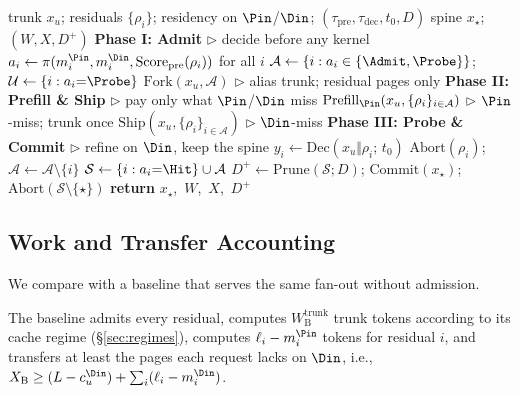 \begin{algorithm}[t]
\caption{\sys{} (one fan-out).
Actions follow \eqref{eq:action}; costs follow \eqref{eq:work}--\eqref{eq:dec}.}
\label{alg:app}
\small
\begin{algorithmic}[1]
\REQUIRE trunk $x_u$; residuals $\{\rho_i\}$; residency on $\Pin$/$\Din$; $(\tau_{\mathrm{pre}},\tau_{\mathrm{dec}},t_0,D)$
\ENSURE spine $x_\star$; $(W,X,D^{+})$
\STATE
\STATE \textbf{Phase I: Admit} \hfill \(\triangleright\) decide before any kernel
\STATE $a_i\leftarrow\pi(m_i^{\Pin},m_i^{\Din},\mathrm{Score}_{\mathrm{pre}}(\rho_i))$ for all $i$
\STATE $\mathcal{A}\leftarrow\{i:a_i\in\{\Admit,\Probe\}\}$;\;
  $\mathcal{U}\leftarrow\{i:a_i{=}\Probe\}$
\STATE $\mathrm{Fork}(x_u,\mathcal{A})$ \hfill \(\triangleright\) alias trunk; residual pages only
\STATE
\STATE \textbf{Phase II: Prefill \& Ship} \hfill \(\triangleright\) pay only what $\Pin$/$\Din$ miss
\STATE $\mathrm{Prefill}_{\Pin}(x_u,\{\rho_i\}_{i\in\mathcal{A}})$ \hfill \(\triangleright\) $\Pin$-miss; trunk once
\STATE $\mathrm{Ship}(x_u,\{\rho_i\}_{i\in\mathcal{A}})$ \hfill \(\triangleright\) $\Din$-miss
\STATE
\STATE \textbf{Phase III: Probe \& Commit} \hfill \(\triangleright\) refine on $\Din$, keep the spine
  \STATE $y_i\leftarrow\mathrm{Dec}(x_u\Vert\rho_i;\,t_0)$
    \STATE $\mathrm{Abort}(\rho_i)$;\; $\mathcal{A}\leftarrow\mathcal{A}\setminus\{i\}$
  \ENDIF
\ENDFOR
\STATE $\mathcal{S}\leftarrow\{i:a_i{=}\Hit\}\cup\mathcal{A}$
\STATE $D^{+}\leftarrow\mathrm{Prune}(\mathcal{S};D)$;\;
  $\mathrm{Commit}(x_\star)$;\;
  $\mathrm{Abort}(\mathcal{S}\setminus\{\star\})$
\STATE \textbf{return} $x_\star$,\ $W$,\ $X$,\ $D^{+}$
\end{algorithmic}
\end{algorithm}

\subsection{Work and Transfer Accounting}
\label{sec:accounting}

We compare \sys with a baseline that serves the same fan-out without admission.

\begin{assumption}[Baseline]
\label{ass:baseline}
The baseline admits every residual, computes $W_{\mathrm{B}}^{\mathrm{trunk}}$ trunk tokens according to its cache regime (\S\ref{sec:regimes}), computes $\ell_i-m_i^{\Pin}$ tokens for residual $i$, and transfers at least the pages each request lacks on $\Din$, i.e., $X_{\mathrm{B}}\ge(L-c_u^{\Din})+\sum_i(\ell_i-m_i^{\Din})$.
\end{assumption}

